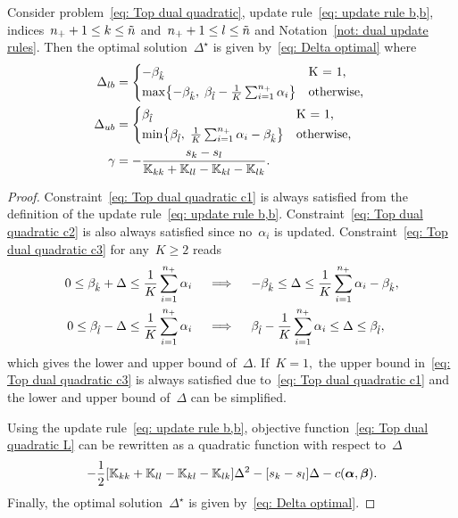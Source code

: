 \begin{proposition}\label{prop: toppushk family quadratic update b,b}
  Consider problem~\eqref{eq: Top dual quadratic}, update rule~\eqref{eq: update rule b,b}, indices~$n_{+} + 1 \leq k \leq \tilde{n}$ and~$n_{+} + 1 \leq l \leq \tilde{n}$  and Notation~\ref{not: dual update rules}. Then the optimal solution~$\Delta^{\star}$ is given by~\eqref{eq: Delta optimal} where
  \begin{align*}
    \Delta_{lb} & = 
      \begin{cases*}
        -\betak & K = 1, \\
        \max \Brac[c]{- \betak,\; \betal - \frac{1}{K} \sum_{i = 1}^{\npos} \alpha_i} & \textrm{otherwise},
      \end{cases*} \\
    \Delta_{ub} & = 
      \begin{cases*}
        \betal & K = 1, \\
        \min \Brac[c]{\betal,\; \frac{1}{K} \sum_{i = 1}^{\npos} \alpha_i - \betak} & \textrm{otherwise},
      \end{cases*} \\
    \gamma & = -\frac{s_k - s_l}{\K_{kk} + \K_{ll} - \K_{kl} - \K_{lk}}.
  \end{align*}
\end{proposition}

\begin{proof}
  Constraint~\eqref{eq: Top dual quadratic c1} is always satisfied from the definition of the update rule~\eqref{eq: update rule b,b}. Constraint~\eqref{eq: Top dual quadratic c2} is also always satisfied since no~$\alpha_i$ is updated. Constraint~\eqref{eq: Top dual quadratic c3} for any~$K \geq 2$ reads
  \begin{align*}
    0 \leq \beta_{\hat{k}} + \Delta \leq \frac{1}{K} \sum_{i = 1}^{n_{+}} \alpha_i 
    & \quad \implies \quad
    -\beta_{\hat{k}} \leq \Delta \leq \frac{1}{K} \sum_{i = 1}^{n_{+}} \alpha_i - \beta_{\hat{k}}, \\
    0 \leq \beta_{\hat{l}} - \Delta \leq \frac{1}{K} \sum_{i = 1}^{n_{+}} \alpha_i
    & \quad \implies \quad
    \beta_{\hat{l}} - \frac{1}{K} \sum_{i = 1}^{n_{+}} \alpha_i \leq \Delta \leq \beta_{\hat{l}},
  \end{align*}
  which gives the lower and upper bound of~$\Delta.$ If~$K = 1,$ the upper bound in~\eqref{eq: Top dual quadratic c3} is always satisfied due to~\eqref{eq: Top dual quadratic c1} and the lower and upper bound of~$\Delta$ can be simplified.
  
  Using the update rule~\eqref{eq: update rule b,b}, objective function~\eqref{eq: Top dual quadratic L} can be rewritten as a quadratic function with respect to~$\Delta$
  \begin{equation*}
    - \frac{1}{2} \Brac[s]{\K_{kk} + \K_{ll} - \K_{kl} - \K_{lk}} \Delta^2
    - \Brac[s]{s_k - s_l} \Delta
    - c(\bm{\alpha}, \bm{\beta}).
  \end{equation*}
  Finally, the optimal solution~$\Delta^{\star}$ is given by~\eqref{eq: Delta optimal}.
\end{proof}

